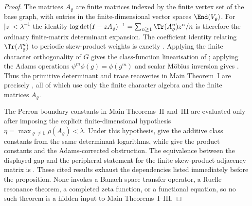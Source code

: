 \begin{proof}
  The matrices \(A_\varrho\) are finite matrices indexed by the finite vertex
  set of the base graph, with entries in the finite-dimensional vector spaces
  \(\End(V_\varrho)\).  For \(|z|<\lambda^{-1}\) the identity
  \(\log\det(I-zA_\varrho)^{-1}
  =\sum_{n\ge1}\Tr(A_\varrho^n)z^n/n\) is therefore the ordinary finite-matrix
  determinant expansion.  The coefficient identity relating
  \(\Tr(A_\varrho^n)\) to periodic skew-product weights is exactly
  .  Applying the finite character
  orthogonality of \(G\) gives the class-function linearisation of
  ; applying the Adams operations
  \(\psi^m\phi(g)=\phi(g^m)\) and scalar M\"obius inversion gives
  .  Thus the primitive determinant and
  trace recoveries in Main Theorem~I are precisely
  , all of which use only the finite character
  algebra and the finite matrices \(A_\varrho\).

  The Perron-boundary constants in Main Theorems~II and~III are evaluated only
  after imposing the explicit finite-dimensional hypothesis
  \(\eta=\max_{\varrho\ne\mathbf1}\rho(A_\varrho)<\lambda\).  Under this
  hypothesis,  give the additive class constants from the same
  determinant logarithms, while
   give the
  product constants and the Adams-corrected obstruction.  The equivalence
  between the displayed gap and the peripheral statement for the finite
  skew-product adjacency matrix is .
  These cited results exhaust the dependencies listed immediately before the
  proposition.  None invokes a Banach-space transfer operator, a Ruelle
  resonance theorem, a completed zeta function, or a functional equation, so no
  such theorem is a hidden input to Main Theorems~I--III.
\end{proof}

